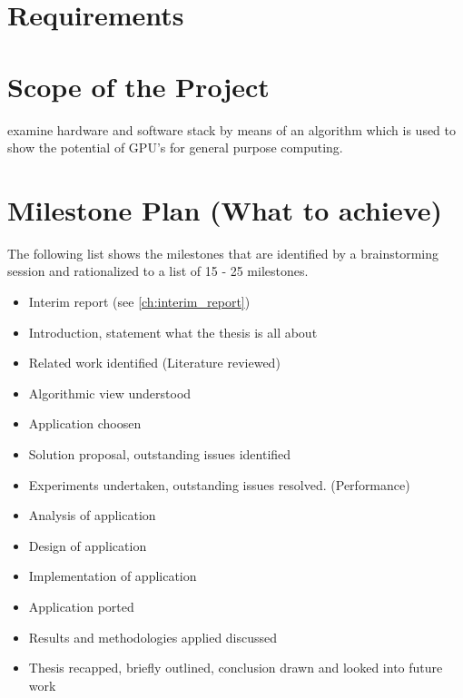 \label{ch:project_planning}
\section*{Requirements} %
\label{sub:requirements}


\section*{Scope of the Project} %
\label{sec:scope_of_the_project}
examine hardware and software stack by means of an algorithm which is used
to show the potential of GPU's for general purpose computing.

\section*{Milestone Plan (What to achieve)} %
\label{sec:milestone_plan_what_to_achieve_}
The following list shows the milestones that are identified by a 
brainstorming session and rationalized to a list of 15 - 25 milestones.

\begin{itemize}
	\item Interim report (see \autoref{ch:interim_report})
	\item Introduction, statement what the thesis is all about
	\item Related work identified (Literature reviewed)
	\item Algorithmic view understood
	\item Application choosen
	\item Solution proposal, outstanding issues identified
	\item Experiments undertaken, outstanding issues resolved. (Performance)
	\item Analysis of application
	\item Design of application
	\item Implementation of application
	\item Application ported
	\item Results and methodologies applied discussed
	\item Thesis recapped, briefly outlined, conclusion drawn and looked into future work
\end{itemize}

